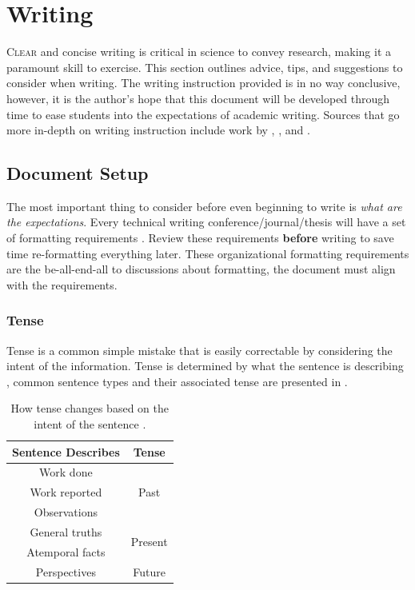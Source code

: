 \section{Writing}

\lettrine{C}{lear} and concise writing is critical in science to convey research, making it a paramount skill to exercise. 
This section outlines advice, tips, and suggestions to consider when writing. 
The writing instruction provided is in no way conclusive, however, it is the author's hope that this document will be developed through time to ease students into the expectations of academic writing. 
Sources that go more in-depth on writing instruction include work by \citeauthor{natureWritingTips} \cite{natureWritingTips}, \citeauthor{writingSpringer} \cite{writingSpringer}, and \citeauthor{writingAIAA} \cite{writingAIAA}.

\subsection{Document Setup}

The most important thing to consider before even beginning to write is \textit{what are the expectations}. 
Every technical writing conference/journal/thesis will have a set of formatting requirements \cite{writingAIAA,writingThesisUofC}. 
Review these requirements \textbf{before} writing to save time re-formatting everything later. 
These organizational formatting requirements are the be-all-end-all to discussions about formatting, the document must align with the requirements. 

\subsubsection{Tense}

Tense is a common simple mistake that is easily correctable by considering the intent of the information. Tense is determined by what the sentence is describing \cite{natureWritingTips}, common sentence types and their associated tense are presented in . 

\begin{table}[hbt!]
	\centering
	\begin{threeparttable}[b]
		\caption{How tense changes based on the intent of the sentence \cite{natureWritingTips}. \label{tab:tenseBasedOnSentence}}
		\begin{tabular}{cc}
			\toprule
			\textbf{Sentence Describes} & \textbf{Tense} \\ \midrule
			Work done & \multirow{3}{*}{Past} \\
			Work reported &  \\
			Observations &  \\ \midrule
			General truths & \multirow{2}{*}{Present} \\
			Atemporal facts &  \\ \midrule
			Perspectives & Future \\ \bottomrule
		\end{tabular}
	\end{threeparttable}
\end{table}

